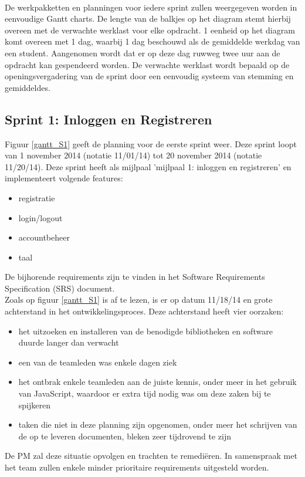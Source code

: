 \documentclass{article}
\begin{document}
 \newline
\\
\noindent De werkpakketten en planningen voor iedere sprint zullen weergegeven worden in eenvoudige Gantt charts. De lengte van de balkjes op het diagram stemt hierbij overeen met de verwachte werklast voor elke opdracht. 1 eenheid op het diagram komt overeen met 1 dag, waarbij 1 dag beschouwd als de gemiddelde werkdag van een student. Aangenomen wordt dat er op deze dag ruwweg twee uur aan de opdracht kan gespendeerd worden. De verwachte werklast wordt bepaald op de openingsvergadering van de sprint door een eenvoudig systeem van stemming en gemiddeldes. \newline

%
\subsection{Sprint 1:  Inloggen en Registreren}

Figuur \ref{gantt_S1} geeft de planning voor de eerste sprint weer. Deze sprint loopt van 1 november 2014 (notatie 11/01/14)  tot 20 november 2014 (notatie 11/20/14). Deze sprint heeft als mijlpaal 'mijlpaal 1: inloggen en registreren' en implementeert volgende features:
\begin{itemize}
\item registratie
\item login/logout
\item accountbeheer
\item taal
\end{itemize}

\noindent De bijhorende requirements zijn te vinden in het Software Requirements Specification (SRS) document. \newline
\\
\noindent Zoals op figuur \ref{gantt_S1}  is af te lezen, is er op datum 11/18/14 en grote achterstand in het ontwikkelingsproces. Deze achterstand heeft vier oorzaken: 
\begin{itemize}
\item het uitzoeken en installeren van de benodigde bibliotheken en software duurde langer dan verwacht
\item een van de teamleden was enkele dagen ziek
\item het ontbrak enkele teamleden aan de juiste kennis, onder meer in het gebruik van JavaScript, waardoor er extra tijd nodig was om deze zaken bij te spijkeren 
\item taken die niet in deze planning zijn opgenomen, onder meer het schrijven van de op te leveren documenten, bleken zeer tijdrovend te zijn
\end{itemize}
De PM zal deze situatie opvolgen en trachten te remedi\"{e}ren. In samenspraak met het team zullen enkele minder prioritaire requirements uitgesteld worden. 
\end{document}
